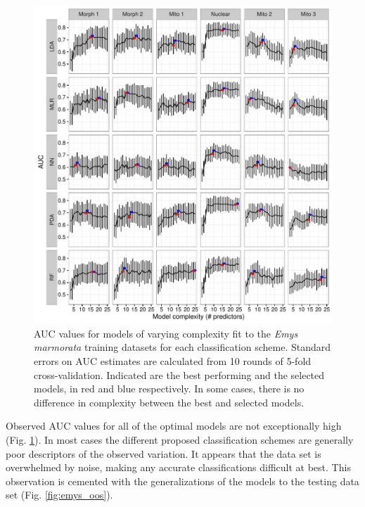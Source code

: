 \documentclass[12pt,letterpaper]{article}
\begin{document}
\begin{figure}[ht]
  \centering
  \includegraphics[height = \textheight, width = \textwidth, keepaspectratio = true]{figure/emys_model_sel}
  \caption{AUC values for models of varying complexity fit to the \textit{Emys marmorata} training datasets for each classification scheme. Standard errors on AUC estimates are calculated from 10 rounds of 5-fold cross-validation. Indicated are the best performing and the selected models, in red and blue respectively. In some cases, there is no difference in complexity between the best and selected models.}
  \label{fig:emys_sel}
\end{figure}

Observed AUC values for all of the optimal models are not exceptionally high (Fig. \ref{fig:emys_sel}). In most cases the different proposed classification schemes are generally poor descriptors of the observed variation. It appears that the data set is overwhelmed by noise, making any accurate classifications difficult at best. This observation is cemented with the generalizations of the models to the testing data set (Fig. \ref{fig:emys_oos}).
\end{document}

